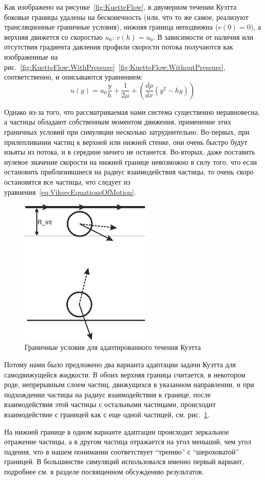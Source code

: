 	Как изображено на рисунке~\ref{fig:KuetteFlow}, в двумерном течении Куэтта боковые границы удалены на бесконечность (или, что то же самое, реализуют трансляционные граничные условия), нижняя граница неподвижна ($v(0) = 0$), а верхняя движется со скоростью $u_0$: $v(h) = u_0$. В зависимости от наличия или отсутствия градиента давления профили скорости потока получаются как изображенные на рис.~\ref{fig:KuetteFlow:WithPressure}~\ref{fig:KuetteFlow:WithoutPressure}, соответственно, и описываются уравнением: 
        \begin{equation} \label{eq:CoetteFlow}
            u(y) = u_0 \frac{y}{h} + \frac{1}{2\mu} + (\frac{dp}{dx}(y^2 -hy))
        \end{equation}

	Однако из-за того, что рассматриваемая нами система существенно неравновесна, а частицы обладают собственным моментом движения, применение этих граничных условий при симуляции несколько затруднительно. Во-первых, при прилепливании частиц к верхней или нижней стенке, они очень быстро будут изьяты из потока, и в середине ничего не останется. Во-вторых, даже поставить нулевое значение скорости на нижней границе невозможно в силу того, что если  остановить приблизившиеся на радиус взаимодействия частицы, то очень скоро остановятся все частицы, что следует из уравнения~\ref{eq:ViksecEquationsOfMotion}.

	\begin{figure}
	\centering
		\includegraphics[height=200pt]{Images/BorderInterraction}
        \caption{Граничные условия для адаптированного течения Куэтта}
        \label{fig:AdaptedKuetteFlow}
	\end{figure}

	Потому нами было предложено два варианта адаптации задачи Куэтта для самодвижущейся жидкости. В обоих верхняя граница считается, в некотором роде, непрерывным слоем частиц, движущихся в указанном направлении, и при подхождении частицы на радиус взаимодействия к границе, после взаимодействия этой частицы с остальными частицами, происходит взаимодействие с границей как с еще одной частицей, см. рис.~\ref{fig:AdaptedKuetteFlow}.

	На нижней границе в одном варианте адаптации происходит зеркальное отражение частицы, а в другом частица отражается на угол меньший, чем угол падения, что в нашем понимании соответствует ``трению'' с ``шероховатой'' границей. В большинстве симуляций использовался именно первый вариант, подробнее см. в разделе посвященном обсуждению результатов.


